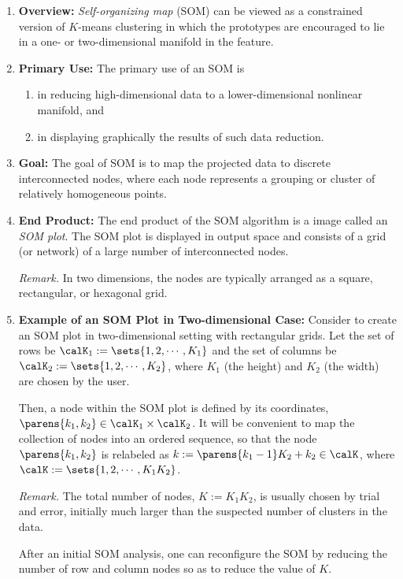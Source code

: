 \documentclass[12pt]{article}
\begin{document}
\begin{enumerate}[label=\textbf{\arabic*.}]

	\item \textbf{Overview:} \emph{Self-organizing map} (SOM) can be viewed as a constrained version of $K$-means clustering in which the prototypes are encouraged to lie in a one- or two-dimensional manifold in the feature. 

	\item \textbf{Primary Use:} The primary use of an SOM is 
	\begin{enumerate}
		\item in reducing high-dimensional data to a lower-dimensional nonlinear manifold, and 
		\item in displaying graphically the results of such data reduction. 
	\end{enumerate}
	
	\item \textbf{Goal:} The goal of SOM is to map the projected data to discrete interconnected nodes, where each node represents a grouping or cluster of relatively homogeneous points. 
	
	\item \textbf{End Product:} The end product of the SOM algorithm is a image called an \emph{SOM plot}. The SOM plot is displayed in output space and consists of a grid (or network) of a large number of interconnected nodes. 
	
	\textit{Remark.} In two dimensions, the nodes are typically arranged as a square, rectangular, or hexagonal grid. 
	
	\item \textbf{Example of an SOM Plot in Two-dimensional Case:} Consider to create an SOM plot in two-dimensional setting with rectangular grids. Let the set of rows be $\calK_1 := \sets{1, 2, \cdots, K_1}$ and the set of columns be $\calK_2 := \sets{1, 2, \cdots, K_2}$, where $K_1$ (the height) and $K_2$ (the width) are chosen by the user. 
	
	Then, a node within the SOM plot is defined by its coordinates, $\parens{k_1, k_2} \in \calK_1 \times \calK_2$. It will be convenient to map the collection of nodes into an ordered sequence, so that the node $\parens{k_1, k_2}$ is relabeled as $k := \parens{k_1 - 1} K_2 + k_2 \in \calK$, where $\calK := \sets{1, 2, \cdots, K_1 K_2}$. 
	
	\textit{Remark.} The total number of nodes, $K := K_1 K_2$, is usually chosen by trial and error, initially much larger than the suspected number of clusters in the data. 
	
	After an initial SOM analysis, one can reconfigure the SOM by reducing the number of row and column nodes so as to reduce the value of $K$. 

\end{enumerate}
\end{document}
